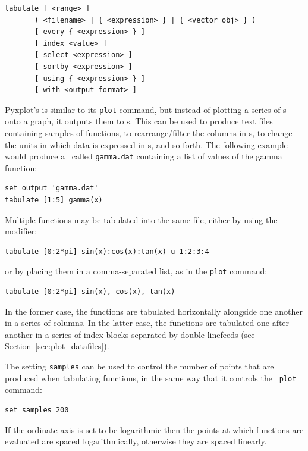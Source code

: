 \begin{verbatim}
tabulate [ <range> ]
       ( <filename> | { <expression> } | { <vector obj> } )
       [ every { <expression> } ]
       [ index <value> ]
       [ select <expression> ]
       [ sortby <expression> ]
       [ using { <expression> } ]
       [ with <output format> ]
\end{verbatim}

Pyxplot's  is similar to its {\tt plot} command, but instead
of plotting a series of \datapoint s onto a graph, it outputs them to \datafile
s. This can be used to produce text files containing samples of functions, to
rearrange/filter the columns in \datafile s, to change the units in which data
is expressed in \datafile s, and so forth.  The following example would produce
a \datafile\ called {\tt gamma.dat} containing a list of values of the gamma
function:

\begin{verbatim}
set output 'gamma.dat'
tabulate [1:5] gamma(x)
\end{verbatim}

\noindent Multiple functions may be tabulated into the same file, either by
using the  modifier:

\begin{verbatim}
tabulate [0:2*pi] sin(x):cos(x):tan(x) u 1:2:3:4
\end{verbatim}

\noindent or by placing them in a comma-separated list, as in the {\tt plot}
command:

\begin{verbatim}
tabulate [0:2*pi] sin(x), cos(x), tan(x)
\end{verbatim}

In the former case, the functions are tabulated horizontally alongside one
another in a series of columns. In the latter case, the functions are tabulated
one after another in a series of index blocks separated by double linefeeds
(see Section~\ref{sec:plot_datafiles}).

The setting {\tt samples} can be used to control the number of points that are
produced when tabulating functions, in the same way that it controls the {\tt
plot} command:

\begin{verbatim}
set samples 200
\end{verbatim}

\noindent If the ordinate axis is set to be logarithmic then the points at which
functions are evaluated are spaced logarithmically, otherwise they are spaced
linearly.

